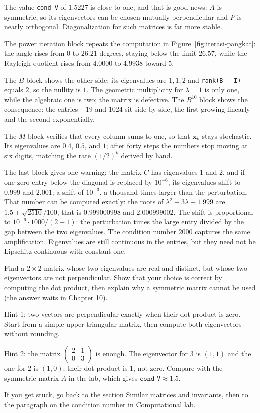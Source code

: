 The value \texttt{cond V} of $1.5227$ is close to one, and that is good news: $A$ is symmetric, so
its eigenvectors can be chosen mutually perpendicular and $P$ is nearly orthogonal.
Diagonalization for such matrices is far more stable.

The power iteration block repeats the computation in Figure~\ref{fig:iterasi-pangkat}: the angle
rises from $0$ to $26.21$ degrees, staying below the limit $26.57$, while the Rayleigh quotient
rises from $4.0000$ to $4.9938$ toward $5$.

The $B$ block shows the other side: its eigenvalues are $1,1,2$ and \texttt{rank(B - I)} equals
$2$, so the nullity is $1$. The geometric multiplicity for $\lambda=1$ is only one, while the
algebraic one is two; the matrix is defective. The $B^{10}$ block shows the consequence: the
entries $-19$ and $1024$ sit side by side, the first growing linearly and the second
exponentially.

The $M$ block verifies that every column sums to one, so that $\mathbf{x}_{k}$ stays stochastic.
Its eigenvalues are $0.4$, $0.5$, and $1$; after forty steps the numbers stop moving at six
digits, matching the rate $(1/2)^{k}$ derived by hand.

The last block gives one warning: the matrix $C$ has eigenvalues $1$ and $2$, and if one zero
entry below the diagonal is replaced by $10^{-6}$, its eigenvalues shift to $0.999$ and $2.001$; a
shift of $10^{-3}$, a thousand times larger than the perturbation. That number can be computed
exactly: the roots of $\lambda^{2}-3\lambda+1.999$ are $1.5\mp\sqrt{2510}/100$, that is
$0.999000998$ and $2.000999002$. The shift is proportional to $10^{-6}\cdot1000/(2-1)$: the
perturbation times the large entry divided by the gap between the two eigenvalues. The condition
number $2000$ captures the same amplification. Eigenvalues are still continuous in the entries,
but they need not be Lipschitz continuous with constant one.

\begin{tantangan}
Find a $2\times2$ matrix whose two eigenvalues are real and distinct, but whose two eigenvectors
are not perpendicular. Show that your choice is correct by computing the dot product, then explain
why a symmetric matrix cannot be used (the answer waits in Chapter 10).

Hint 1: two vectors are perpendicular exactly when their dot product is zero. Start from a simple
upper triangular matrix, then compute both eigenvectors without rounding.

Hint 2: the matrix $\begin{pmatrix}2&1\\0&3\end{pmatrix}$ is enough. The eigenvector for $3$ is
$(1,1)$ and the one for $2$ is $(1,0)$; their dot product is $1$, not zero. Compare with the
symmetric matrix $A$ in the lab, which gives $\texttt{cond V}\approx1.5$.

If you get stuck, go back to the section Similar matrices and invariants, then to the paragraph on
the condition number in Computational lab.
\end{tantangan}

